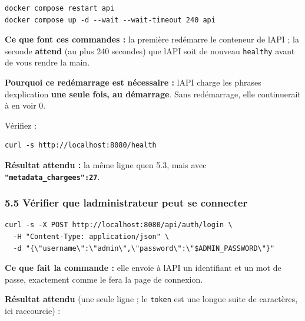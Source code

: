 \documentclass[
  french,
  11pt,
  a4paper,
]{article}
\begin{document}
\begin{Verbatim}[breaklines=true,breakanywhere=true,fontsize=\small,frame=leftline,framerule=1.6pt,rulecolor=\color{credixblue},framesep=3mm,xleftmargin=2mm,xrightmargin=1mm]
docker compose restart api
docker compose up -d --wait --wait-timeout 240 api
\end{Verbatim}

\textbf{Ce que font ces commandes :} la première redémarre le conteneur
de l\textquotesingle API ; la seconde \textbf{attend} (au plus 240
secondes) que l\textquotesingle API soit de nouveau \texttt{healthy}
avant de vous rendre la main.

\textbf{Pourquoi ce redémarrage est nécessaire :} l\textquotesingle API
charge les phrases d\textquotesingle explication \textbf{une seule fois,
au démarrage}. Sans redémarrage, elle continuerait à en voir 0.

Vérifiez :

\begin{Verbatim}[breaklines=true,breakanywhere=true,fontsize=\small,frame=leftline,framerule=1.6pt,rulecolor=\color{credixblue},framesep=3mm,xleftmargin=2mm,xrightmargin=1mm]
curl -s http://localhost:8080/health
\end{Verbatim}

\textbf{Résultat attendu :} la même ligne qu\textquotesingle en 5.3,
mais avec \textbf{\texttt{"metadata\_\allowbreak{}chargees":27}}.

\subsubsection{5.5 Vérifier que l\textquotesingle administrateur peut se
connecter}\label{55-vuxe9rifier-que-ladministrateur-peut-se-connecter}

\begin{Verbatim}[breaklines=true,breakanywhere=true,fontsize=\small,frame=leftline,framerule=1.6pt,rulecolor=\color{credixblue},framesep=3mm,xleftmargin=2mm,xrightmargin=1mm]
curl -s -X POST http://localhost:8080/api/auth/login \
  -H "Content-Type: application/json" \
  -d "{\"username\":\"admin\",\"password\":\"$ADMIN_PASSWORD\"}"
\end{Verbatim}

\textbf{Ce que fait la commande :} elle envoie à l\textquotesingle API
un identifiant et un mot de passe, exactement comme le fera la page de
connexion.

\textbf{Résultat attendu} (une seule ligne ; le \texttt{token} est une
longue suite de caractères, ici raccourcie) :
\end{document}

